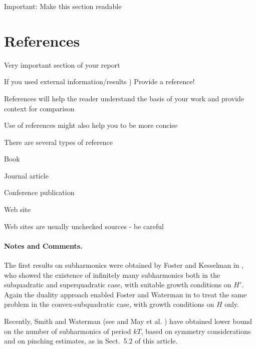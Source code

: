 \documentclass[lnicst,a4paper]{svmultln}
\begin{document}
Important:
Make this section readable





\section{References}
Very important section of your report

If you used external information/results
)
Provide a
reference!

References will help the reader understand the basis of your
work and provide context for comparison

Use of references might also help you to be more concise

There are several types of reference

Book

Journal article

Conference publication

Web site

Web sites are usually unchecked sources -
be careful





\paragraph{Notes and Comments.}
The first results on subharmonics were
obtained by Foster and Kesselman in \cite{fos:kes}, who showed the existence of
infinitely many subharmonics both in the subquadratic and superquadratic
case, with suitable growth conditions on $H'$. Again the duality
approach enabled Foster and Waterman in \cite{fos:kes:2} to treat the
same problem in the convex-subquadratic case, with growth conditions on
$H$ only.

Recently, Smith and Waterman (see \cite{smit:wat} and May et al. \cite{mes})
have obtained lower bound on the number of subharmonics of period $kT$,
based on symmetry considerations and on pinching estimates, as in
Sect.~5.2 of this article.




\end{document}

